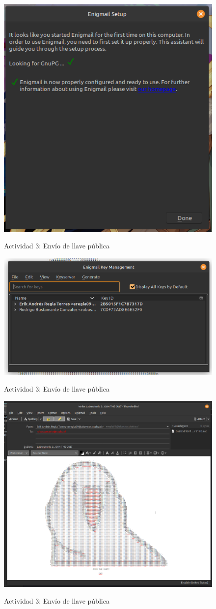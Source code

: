 \documentclass[11pt]{utalcaDoc}
\begin{document}
\begin{figure}[ht]
	\centering
	\includegraphics[width=.6\textwidth]{images/send1}\\
	\caption{Actividad 3: Envío de llave pública}
	\label{FIG:send1}
\end{figure}

\begin{figure}[ht]
	\centering
	\includegraphics[width=.6\textwidth]{images/send2}\\
	\caption{Actividad 3: Envío de llave pública}
	\label{FIG:send2}
\end{figure}

\begin{figure}[ht]
	\centering
	\includegraphics[width=.6\textwidth]{images/send3}\\
	\caption{Actividad 3: Envío de llave pública}
	\label{FIG:send2}
\end{figure}
\end{document}
